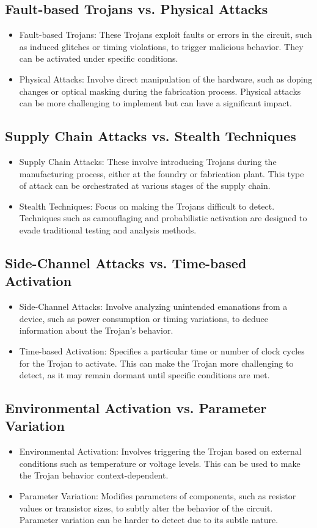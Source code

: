  \subsection{Fault-based Trojans vs. Physical Attacks}
 \begin{itemize}
 	\item Fault-based Trojans: These Trojans exploit faults or errors in the circuit, such as induced glitches or timing violations, to trigger malicious behavior. They can be activated under specific conditions.
 	\item Physical Attacks: Involve direct manipulation of the hardware, such as doping changes or optical masking during the fabrication process. Physical attacks can be more challenging to implement but can have a significant impact.
 \end{itemize}
 \subsection{Supply Chain Attacks vs. Stealth Techniques}
 \begin{itemize}
 	\item Supply Chain Attacks: These involve introducing Trojans during the manufacturing process, either at the foundry or fabrication plant. This type of attack can be orchestrated at various stages of the supply chain.
 	\item Stealth Techniques: Focus on making the Trojans difficult to detect. Techniques such as camouflaging and probabilistic activation are designed to evade traditional testing and analysis methods.
 \end{itemize}
 \subsection{Side-Channel Attacks vs. Time-based Activation}
 \begin{itemize}
 	\item Side-Channel Attacks: Involve analyzing unintended emanations from a device, such as power consumption or timing variations, to deduce information about the Trojan's behavior.
 	\item Time-based Activation: Specifies a particular time or number of clock cycles for the Trojan to activate. This can make the Trojan more challenging to detect, as it may remain dormant until specific conditions are met.
 \end{itemize}
 \subsection{Environmental Activation vs. Parameter Variation}
 \begin{itemize}
 	\item Environmental Activation: Involves triggering the Trojan based on external conditions such as temperature or voltage levels. This can be used to make the Trojan behavior context-dependent.
 	\item Parameter Variation: Modifies parameters of components, such as resistor values or transistor sizes, to subtly alter the behavior of the circuit. Parameter variation can be harder to detect due to its subtle nature.
 \end{itemize}
